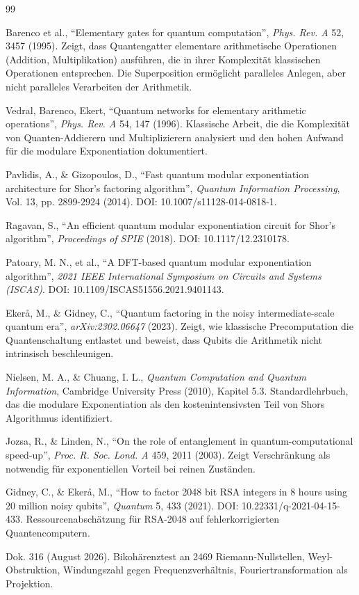 \begin{thebibliography}{99}

Barenco et al., ``Elementary gates for quantum computation'',
\emph{Phys. Rev. A} 52, 3457 (1995).
Zeigt, dass Quantengatter elementare arithmetische Operationen
(Addition, Multiplikation) ausführen, die in ihrer Komplexität
klassischen Operationen entsprechen. Die Superposition ermöglicht
paralleles Anlegen, aber nicht paralleles Verarbeiten der Arithmetik.

Vedral, Barenco, Ekert, ``Quantum networks for elementary arithmetic
operations'', \emph{Phys. Rev. A} 54, 147 (1996).
Klassische Arbeit, die die Komplexität von Quanten-Addierern und
Multiplizierern analysiert und den hohen Aufwand für die modulare
Exponentiation dokumentiert.

Pavlidis, A., \& Gizopoulos, D., ``Fast quantum modular exponentiation
architecture for Shor's factoring algorithm'',
\emph{Quantum Information Processing}, Vol. 13, pp. 2899-2924 (2014).
DOI: 10.1007/s11128-014-0818-1.

Ragavan, S., ``An efficient quantum modular exponentiation circuit for
Shor's algorithm'', \emph{Proceedings of SPIE} (2018).
DOI: 10.1117/12.2310178.

Patoary, M. N., et al., ``A DFT-based quantum modular exponentiation
algorithm'', \emph{2021 IEEE International Symposium on Circuits and
Systems (ISCAS)}.
DOI: 10.1109/ISCAS51556.2021.9401143.

Ekerå, M., \& Gidney, C., ``Quantum factoring in the noisy
intermediate-scale quantum era'', \emph{arXiv:2302.06647} (2023).
Zeigt, wie klassische Precomputation die Quantenschaltung entlastet und
beweist, dass Qubits die Arithmetik nicht intrinsisch beschleunigen.

Nielsen, M. A., \& Chuang, I. L., \emph{Quantum Computation and Quantum
Information}, Cambridge University Press (2010), Kapitel 5.3.
Standardlehrbuch, das die modulare Exponentiation als den
kostenintensivsten Teil von Shors Algorithmus identifiziert.

Jozsa, R., \& Linden, N., ``On the role of entanglement in
quantum-computational speed-up'', \emph{Proc. R. Soc. Lond. A} 459,
2011 (2003).
Zeigt Verschränkung als notwendig für exponentiellen Vorteil bei reinen
Zuständen.

Gidney, C., \& Ekerå, M., ``How to factor 2048 bit RSA integers in 8
hours using 20 million noisy qubits'', \emph{Quantum} 5, 433 (2021).
DOI: 10.22331/q-2021-04-15-433.
Ressourcenabschätzung für RSA-2048 auf fehlerkorrigierten
Quantencomputern.

Dok. 316 (August 2026).
Bikohärenztest an 2469 Riemann-Nullstellen, Weyl-Obstruktion,
Windungszahl gegen Frequenzverhältnis, Fouriertransformation als
Projektion.

\end{thebibliography}
